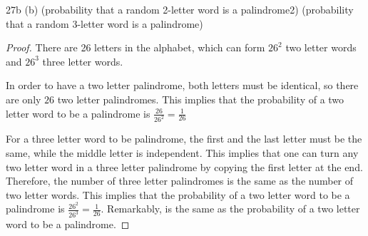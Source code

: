 \begin{exercise}{27b}
(b) (probability that a random 2-letter word is a palindrome2) (probability that a
random 3-letter word is a palindrome)
\end{exercise}

\begin{proof}
    There are 26 letters in the alphabet, which can form $26^2$ two letter words and $26^3$ three letter words.

    In order to have a two letter palindrome, both letters must be identical, so there are only $26$ two letter palindromes. This implies that the probability of a two letter word to be a palindrome is $\frac{26}{26^2} = \frac{1}{26}$

    For a three letter word to be palindrome, the first and the last letter must be the same, while the middle letter is independent. This implies that one can turn any two letter word in a three letter palindrome by copying the first letter at the end. Therefore, the number of three letter palindromes is the same as the number of two letter words. This implies that the probability of a two letter word to be a palindrome is $\frac{26^2}{26^3} = \frac{1}{26}$. Remarkably, is the same as the probability of a two letter word to be a palindrome.
\end{proof}

